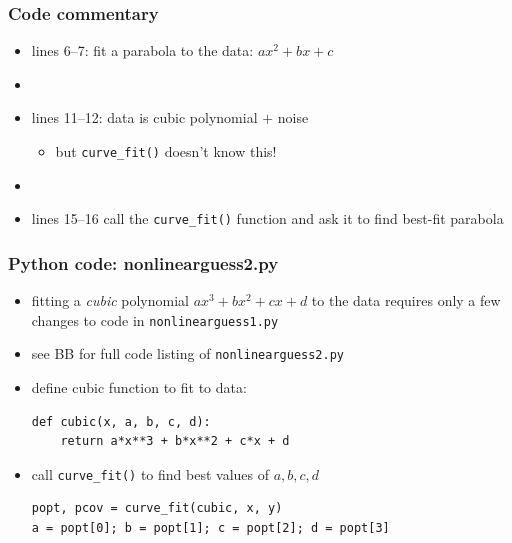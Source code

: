 \documentclass[english,14pt]{beamer}
\begin{document}

\begin{frame}[fragile]

\frametitle{Code commentary}

\begin{itemize}
	\item lines 6--7: fit a parabola to the data: $ax^2 + bx + c$
	\item[]
	\item lines 11--12: data is cubic polynomial $+$ noise
	\begin{itemize}
		\item but \texttt{curve\_fit()} doesn't know this!
	\end{itemize}
	\item[]
	\item lines 15--16 call the \texttt{curve\_fit()} function and ask it to find best-fit parabola
\end{itemize}

\end{frame}


\begin{frame}[fragile]

\frametitle{Python code: nonlinearguess2.py}

\begin{itemize}
	\item fitting a \emph{cubic} polynomial $ax^3 + bx^2 + cx + d$ to the data requires only a few changes to code in \texttt{nonlinearguess1.py}
	\item see BB for full code listing of \texttt{nonlinearguess2.py}
	\item define cubic function to fit to data:
	\begin{lstlisting}[style=CStyle,basicstyle=\footnotesize]
def cubic(x, a, b, c, d):
    return a*x**3 + b*x**2 + c*x + d
\end{lstlisting}
	\item call \texttt{curve\_fit()} to find best values of $a, b, c, d$
	\begin{lstlisting}[style=CStyle,basicstyle=\footnotesize]
popt, pcov = curve_fit(cubic, x, y)
a = popt[0]; b = popt[1]; c = popt[2]; d = popt[3]
\end{lstlisting}
\end{itemize}

\end{frame}
\end{document}
